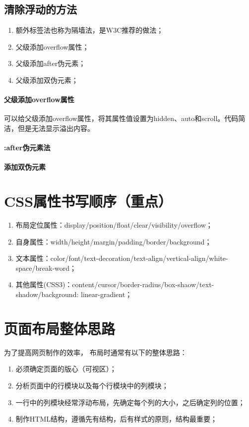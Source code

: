 \subsection{清除浮动的方法}
\begin{enumerate}
    \item 额外标签法也称为隔墙法，是W3C推荐的做法；
    \item 父级添加overflow属性；
    \item 父级添加after伪元素；
    \item 父级添加双伪元素；
\end{enumerate}
\paragraph{父级添加overflow属性} 可以给父级添加overflow属性，将其属性值设置为hidden、auto和scroll。代码简洁，但是无法显示溢出内容。

\paragraph{:after伪元素法} 

\paragraph{添加双伪元素}
\section{CSS属性书写顺序（重点）}
\begin{enumerate}
    \item 布局定位属性：display/position/float/clear/visibility/overflow；
    \item 自身属性：width/height/margin/padding/border/background；
    \item 文本属性：color/font/text-decoration/text-align/vertical-align/white-space/break-word；
    \item 其他属性(CSS3)：content/cursor/border-radius/box-shaow/text-shadow/background: linear-gradient；
\end{enumerate}
\section{页面布局整体思路}
为了提高网页制作的效率， 布局时通常有以下的整体思路：
\begin{enumerate}
    \item 必须确定页面的版心（可视区）；
    \item 分析页面中的行模块以及每个行模块中的列模块；
    \item 一行中的列模块经常浮动布局，先确定每个列的大小，之后确定列的位置；
    \item 制作HTML结构，遵循先有结构，后有样式的原则，结构最重要；
\end{enumerate}